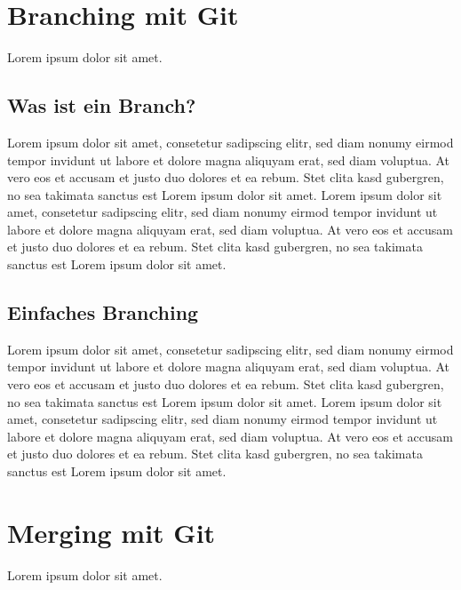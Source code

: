 \documentclass[12pt,a4paper,bibliography=totocnumbered,listof=totocnumbered]{scrartcl}
\begin{document}
\section{Branching mit Git}
Lorem ipsum dolor sit amet.

\subsection{Was ist ein Branch?}
Lorem ipsum dolor sit amet, consetetur sadipscing elitr, sed diam nonumy eirmod tempor invidunt ut labore et dolore magna aliquyam erat, sed diam voluptua. At vero eos et accusam et justo duo dolores et ea rebum. Stet clita kasd gubergren, no sea takimata sanctus est Lorem ipsum dolor sit amet. Lorem ipsum dolor sit amet, consetetur sadipscing elitr, sed diam nonumy eirmod tempor invidunt ut labore et dolore magna aliquyam erat, sed diam voluptua. At vero eos et accusam et justo duo dolores et ea rebum. Stet clita kasd gubergren, no sea takimata sanctus est Lorem ipsum dolor sit amet.

\subsection{Einfaches Branching}
Lorem ipsum dolor sit amet, consetetur sadipscing elitr, sed diam nonumy eirmod tempor invidunt ut labore et dolore magna aliquyam erat, sed diam voluptua. At vero eos et accusam et justo duo dolores et ea rebum. Stet clita kasd gubergren, no sea takimata sanctus est Lorem ipsum dolor sit amet. Lorem ipsum dolor sit amet, consetetur sadipscing elitr, sed diam nonumy eirmod tempor invidunt ut labore et dolore magna aliquyam erat, sed diam voluptua. At vero eos et accusam et justo duo dolores et ea rebum. Stet clita kasd gubergren, no sea takimata sanctus est Lorem ipsum dolor sit amet.
\pagebreak

\section{Merging mit Git}
Lorem ipsum dolor sit amet.
\end{document}
